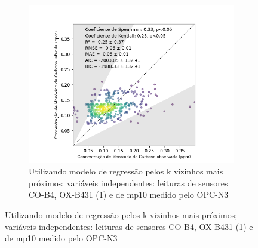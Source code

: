 \begin{figure}[h]
\begin{subfigure}{0.49\textwidth}
        \includegraphics[width=\textwidth]{chapters/4-CALIBRAÇÃO MÚLTIPLOS SENSORES/Figuras/CO-co-o31-pm10-knn-Regression.png}
        \caption{Utilizando modelo de regressão pelos k vizinhos mais próximos; variáveis independentes: leituras de sensores CO-B4, OX-B431 (1) e de \acrshort{mp10} medido pelo OPC-N3}
        \label{fig:data-co-o31-mp10-reference-corr-KNN}
    \end{subfigure}
\end{figure}